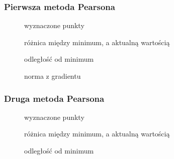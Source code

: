 \documentclass[a4paper, 10pt]{article}
\begin{document}
			\subsubsection{Pierwsza metoda Pearsona}
			    \begin{figure}[H]
			        \centering
			        \def \svgwidth{0.75\columnwidth}
			        
			        \caption{wyznaczone punkty}
			    \end{figure}\noindent
			
			
			    \begin{figure}[H]
			        \centering
			        \def \svgwidth{0.75\columnwidth}
			        
			        \caption{różnica między minimum, a aktualną wartością}
			    \end{figure}\noindent
			
			
			    \begin{figure}[H]
			        \centering
			        \def \svgwidth{0.75\columnwidth}
			        
			        \caption{odległość od minimum}
			    \end{figure}\noindent
			    
   			   \begin{figure}[H]
    			   	\centering
    			   	\def \svgwidth{0.75\columnwidth}
    			   	
    			   	\caption{norma z gradientu}
   			   \end{figure}\noindent
		
			\subsubsection{Druga metoda Pearsona}
			    \begin{figure}[H]
			        \centering
			        \def \svgwidth{0.75\columnwidth}
			        
			        \caption{wyznaczone punkty}
			    \end{figure}\noindent
			
			
			    \begin{figure}[H]
			        \centering
			        \def \svgwidth{0.75\columnwidth}
			        
			        \caption{różnica między minimum, a aktualną wartością}
			    \end{figure}\noindent
			
			
			    \begin{figure}[H]
			        \centering
			        \def \svgwidth{0.75\columnwidth}
			        
			        \caption{odległość od minimum}
			    \end{figure}\noindent
				
\end{document}
